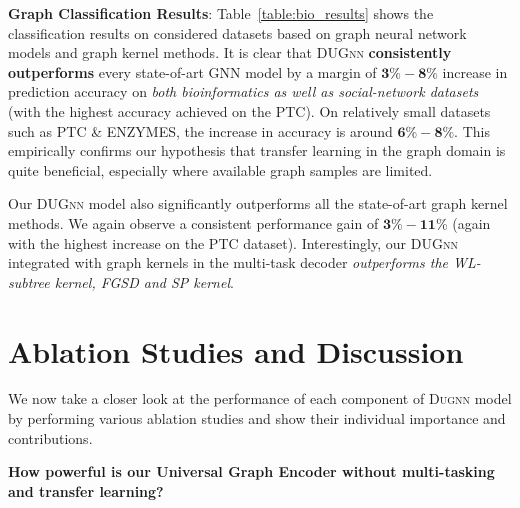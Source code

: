 \documentclass{article}
\begin{document}
\noindent \textbf{Graph Classification Results}: Table~\ref{table:bio_results} shows the classification   results on  considered   datasets based on graph neural network models and graph kernel methods. It is clear that \textsc{DUGnn}  \textbf{consistently outperforms} every state-of-art  GNN model  by a margin of  $\mathbf{3\textbf{\%}-8\textbf{\%}}$ increase in prediction accuracy on \emph{both bioinformatics  as well as  social-network datasets} (with the highest accuracy achieved  on the {\selectfont PTC}).
On relatively  small datasets such as {\selectfont PTC \& ENZYMES},   the increase  in accuracy is around $\mathbf{6\textbf{\%}-8\textbf{\%}}$. This empirically confirms our hypothesis that transfer learning in the graph domain  is quite   beneficial,  especially where available graph samples are limited. 

Our \textsc{DUGnn} model  also  significantly outperforms all the state-of-art graph kernel methods. We again  observe a consistent performance gain of   $\mathbf{3\textbf{\%}-11\textbf{\%}}$  (again with the highest increase on the  {\selectfont PTC} dataset). Interestingly, our \textsc{DUGnn} integrated with graph kernels in the multi-task decoder \emph{outperforms the  WL-subtree  kernel, FGSD and SP  kernel}.





















\section{Ablation Studies and Discussion}\label{sec:ablation_study}

We now take a closer look at the performance of each component of \textsc{Dugnn} model by   performing various ablation studies and show their individual importance and contributions. 



\noindent \textbf{How powerful is our    Universal Graph Encoder without multi-tasking and transfer learning?} 
\end{document}
